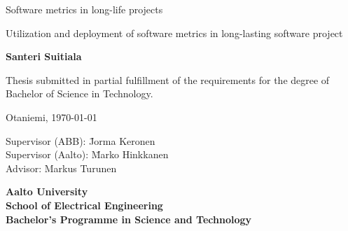 {\parindent0pt %
\begin{spacing}{1.1}

 {\sffamily{}}
\end{spacing}

\vspace{12.7mm}

\begin{spacing}{1.63}
{\fontsize{17.8pt}{17.8pt}\selectfont Software metrics in long-life projects}
\end{spacing}

\vspace{10.5mm}

\begin{spacing}{1.2}
{\fontsize{13pt}{13pt}\selectfont Utilization and deployment of software metrics in long-lasting software project}
\end{spacing}

\vspace{10.6mm}

{\fontsize{13.9pt}{13.9pt}\bfseries\sffamily\lsstyle Santeri Suitiala}

\vfill

{\fontsize{10.3pt}{10.3pt}\sffamily\lsstyle\raggedright
\begin{spacing}{1.06}

Thesis submitted in partial fulfillment of the requirements for the
degree of Bachelor of Science in Technology.

Otaniemi, \today

\begin{tabbing}
Supervisor (ABB):\hspace{6mm} \= Jorma Keronen \\
Supervisor (Aalto):\hspace{6mm} \= Marko Hinkkanen \\
Advisor: \> Markus Turunen
\end{tabbing}
\vspace{-4mm}
\end{spacing}
} %

\vspace{11.5mm}

\begin{spacing}{.9}
{\bfseries\sffamily\lsstyle Aalto University \\
School of Electrical Engineering \\
Bachelor’s Programme in Science and Technology}
\end{spacing}
} %



